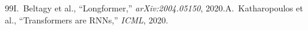 \begin{thebibliography}{99}I.~Beltagy et al., ``Longformer,'' \emph{arXiv:2004.05150}, 2020.A.~Katharopoulos et al., ``Transformers are RNNs,'' \emph{ICML}, 2020.\end{thebibliography}
